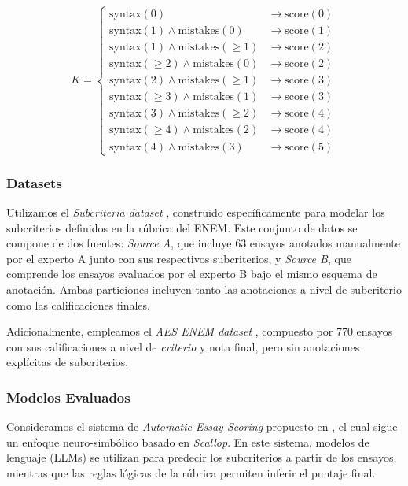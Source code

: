 \documentclass[12pt]{article}
\begin{document}
\[
K = \left\{
\begin{array}{ll}
\text{syntax}(0) & \rightarrow \text{score}(0) \\
\text{syntax}(1) \land \text{mistakes}(0) & \rightarrow \text{score}(1) \\
\text{syntax}(1) \land \text{mistakes}(\geq 1) & \rightarrow \text{score}(2) \\
\text{syntax}(\geq 2) \land \text{mistakes}(0) & \rightarrow \text{score}(2) \\
\text{syntax}(2) \land \text{mistakes}(\geq 1) & \rightarrow \text{score}(3) \\
\text{syntax}(\geq 3) \land \text{mistakes}(1) & \rightarrow \text{score}(3) \\
\text{syntax}(3) \land \text{mistakes}(\geq 2) & \rightarrow \text{score}(4) \\
\text{syntax}(\geq 4) \land \text{mistakes}(2) & \rightarrow \text{score}(4) \\
\text{syntax}(4) \land \text{mistakes}(3) & \rightarrow \text{score}(5)
\end{array}
\right.
\]

\subsubsection{Datasets}
Utilizamos el \textit{Subcriteria dataset} \cite{feedbackpropor}, construido específicamente para modelar los subcriterios definidos en la rúbrica del ENEM. Este conjunto de datos se compone de dos fuentes: \textit{Source A}, que incluye 63 ensayos anotados manualmente por el experto A junto con sus respectivos subcriterios, y \textit{Source B}, que comprende los ensayos evaluados por el experto B bajo el mismo esquema de anotación. Ambas particiones incluyen tanto las anotaciones a nivel de subcriterio como las calificaciones finales.

Adicionalmente, empleamos el \textit{AES ENEM dataset} \cite{propor2024}, compuesto por 770 ensayos con sus calificaciones a nivel de \textit{criterio} y nota final, pero sin anotaciones explícitas de subcriterios.


\subsubsection{Modelos Evaluados}

Consideramos el sistema de \textit{Automatic Essay Scoring} propuesto en \cite{feedbackpropor}, el cual sigue un enfoque neuro-simbólico basado en \textit{Scallop}. En este sistema, modelos de lenguaje (LLMs) se utilizan para predecir los subcriterios a partir de los ensayos, mientras que las reglas lógicas de la rúbrica permiten inferir el puntaje final.
\end{document}
